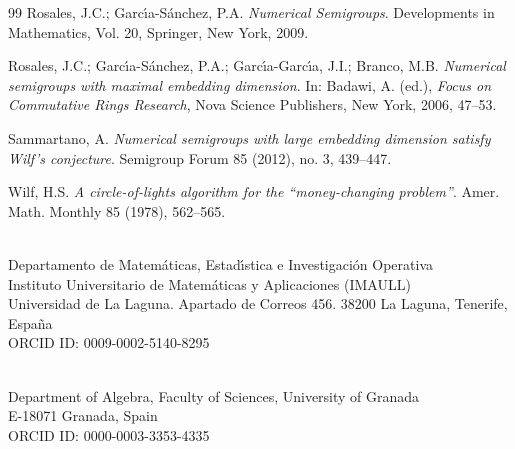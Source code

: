 \documentclass[11pt]{article}
\numberwithin{equation}{section}
\begin{document}
\begin{thebibliography}{99}
 Rosales, J.C.; Garc\'{\i}a-S\'anchez, P.A. \textit{Numerical Semigroups}. Developments in Mathematics, Vol. 20, Springer, New York, 2009.

 Rosales, J.C.; Garc\'{\i}a-S\'anchez, P.A.; Garc\'{\i}a-Garc\'{\i}a, J.I.; Branco, M.B. \textit{Numerical semigroups with maximal embedding dimension}. In: Badawi, A. (ed.), \textit{Focus on Commutative Rings Research}, Nova Science Publishers, New York, 2006, 47--53.

 Sammartano, A. \textit{Numerical semigroups with large embedding dimension satisfy Wilf's conjecture}. Semigroup Forum 85 (2012), no. 3, 439--447.

 Wilf, H.S. \textit{A circle-of-lights algorithm for the ``money-changing problem''}. Amer. Math. Monthly 85 (1978), 562--565.

\end{thebibliography}

\\
Departamento de Matem\'aticas, Estad\'{\i}stica e Investigaci\'on Operativa\\
	Instituto Universitario de Matem\'aticas y Aplicaciones (IMAULL)\\ Universidad de La Laguna. Apartado de Correos 456.
	38200 La Laguna, Tenerife, Espa\~na \\ORCID ID: 0009-0002-5140-8295
	
	\vspace{0.3cm}

\\
Department of Algebra, Faculty of Sciences, University of Granada\\ E-18071 Granada, Spain \\ORCID ID: 0000-0003-3353-4335
	
	
\end{document}
